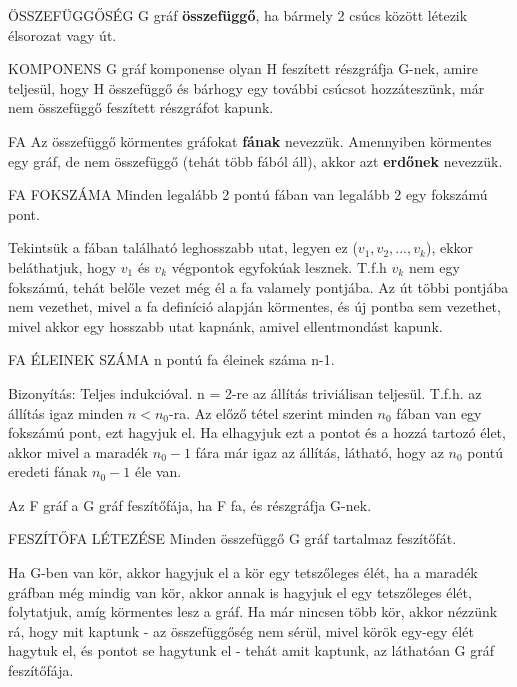 \begin{definicio}{ÖSSZEFÜGGŐSÉG}
G gráf \textbf{összefüggő}, ha bármely 2 csúcs között létezik élsorozat vagy út.
\end{definicio}

\begin{definicio}{KOMPONENS}
G gráf komponense olyan H feszített részgráfja G-nek, amire teljesül, hogy H összefüggő és bárhogy egy további csúcsot hozzáteszünk, már nem összefüggő feszített részgráfot kapunk.
\end{definicio}

\begin{definicio}{FA}
Az összefüggő körmentes gráfokat \textbf{fának} nevezzük. Amennyiben körmentes egy gráf, de nem összefüggő (tehát több fából áll), akkor azt \textbf{erdőnek} nevezzük.
\end{definicio}

\begin{tetel}{FA FOKSZÁMA}
Minden legalább 2 pontú fában van legalább 2 egy fokszámú pont.
\end{tetel}

\begin{bizonyitas}{}
Tekintsük a fában található leghosszabb utat, legyen ez ($v_1, v_2,..., v_k$), ekkor beláthatjuk, hogy $v_1$ és $v_k$ végpontok egyfokúak lesznek. T.f.h $v_k$ nem egy fokszámú, tehát belőle vezet még él a fa valamely pontjába. Az út többi pontjába nem vezethet, mivel a fa definíció alapján körmentes, és új pontba sem vezethet, mivel akkor egy hosszabb utat kapnánk, amivel ellentmondást kapunk.
\end{bizonyitas}

\begin{tetel}{FA ÉLEINEK SZÁMA}
n pontú fa éleinek száma n-1.
\end{tetel}

\begin{bizonyitas}{}
Bizonyítás: Teljes indukcióval. n = 2-re az állítás triviálisan teljesül. T.f.h. az állítás igaz minden $n < n_0$-ra. Az előző tétel szerint minden $n_0$ fában van egy fokszámú pont, ezt hagyjuk el. Ha elhagyjuk ezt a pontot és a hozzá tartozó élet, akkor mivel a maradék $n_0 - 1$ fára már igaz az állítás, látható, hogy az $n_0$ pontú eredeti fának $n_0 - 1$ éle van.
\end{bizonyitas}

\begin{definicio}{Az F gráf a G gráf feszítőfája, ha F fa, és részgráfja G-nek.}
\end{definicio}

\begin{tetel}{FESZÍTŐFA LÉTEZÉSE}
Minden összefüggő G gráf tartalmaz feszítőfát.
\end{tetel}

\begin{bizonyitas}{}
Ha G-ben van kör, akkor hagyjuk el a kör egy tetszőleges élét, ha a maradék gráfban még mindig van kör, akkor annak is hagyjuk el egy tetszőleges élét, folytatjuk, amíg körmentes lesz a gráf. Ha már nincsen több kör, akkor nézzünk rá, hogy mit kaptunk - az összefüggőség nem sérül, mivel körök egy-egy élét hagytuk el, és pontot se hagytunk el - tehát amit kaptunk, az láthatóan G gráf feszítőfája.
\end{bizonyitas}
